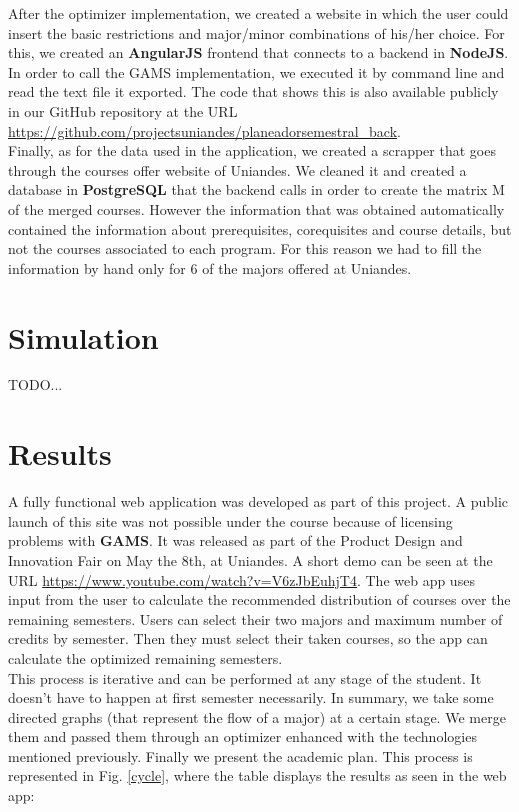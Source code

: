 \documentclass[journal]{IEEEtran}
\begin{document}
After the optimizer implementation, we created a website in which the user could insert the basic restrictions and major/minor combinations of his/her choice. For this, we created an \textbf{AngularJS} frontend that connects to a backend in \textbf{NodeJS}. In order to call the GAMS implementation, we executed it by command line and read the text file it exported. The code that shows this is also available publicly in our GitHub repository at the URL  \url{https://github.com/projectsuniandes/planeadorsemestral_back}.\\

Finally, as for the data used in the application, we created a scrapper that goes through the courses offer website of Uniandes. We cleaned it and created a database in \textbf{PostgreSQL} that the backend calls in order to create the matrix M of the merged courses. However the information that was obtained automatically contained the information about prerequisites, corequisites and course details, but not the courses associated to each program. For this reason we had to fill the information by hand only for 6 of the majors offered at Uniandes.\\

\section{Simulation}

TODO...\\

\section{Results}

A fully functional web application was developed as part of this project. A public launch of this site was not possible under the course because of licensing problems with \textbf{GAMS}. It was released as part of the Product Design and Innovation Fair on May the 8th, at Uniandes. A short demo can be seen at the URL \url{https://www.youtube.com/watch?v=V6zJbEuhjT4}. The web app uses input from the user to calculate the recommended distribution of courses over the remaining semesters. Users can select their two majors and maximum number of credits by semester. Then they must select their taken courses, so the app can calculate the optimized remaining semesters.\\

This process is iterative and can be performed at any stage of the student. It doesn't have to happen at first semester necessarily. In summary, we take some directed graphs (that represent the flow of a major) at a certain stage. We merge them and passed them through an optimizer enhanced with the technologies mentioned previously. Finally we present the academic plan. This process is represented in Fig. \ref{cycle}, where the table displays the results as seen in the web app:
\end{document}
